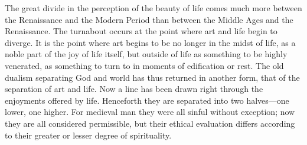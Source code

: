 The great divide in the perception of the beauty of life comes much more
between the Renaissance and the Modern Period than between the Middle
Ages and the Renaissance. The turnabout occurs at the point where art
and life begin to diverge. It is the point where art begins to be no
longer
\protect\hypertarget{05_TRANSLATOR_S_INTRODUCTION.xhtmlux5cux23page_xvi}{}{}in
the midst of life, as a noble part of the joy of life itself, but
outside of life as something to be highly venerated, as something to
turn to in moments of edification or rest. The old dualism separating
God and world has thus returned in another form, that of the separation
of art and life. Now a line has been drawn right through the enjoyments
offered by life. Henceforth they are separated into two halves---one
lower, one higher. For medieval man they were all sinful without
exception; now they are all considered permissible, but their ethical
evaluation differs according to their greater or lesser degree of
spirituality.

